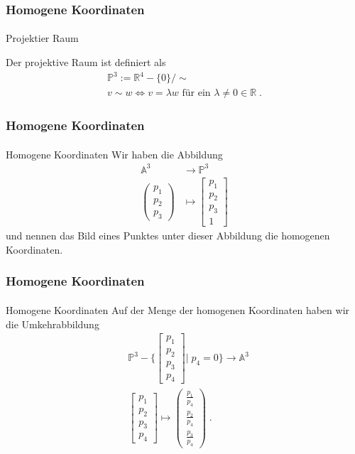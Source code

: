 \documentclass{beamer}
\begin{document}
\begin{frame}
    \frametitle{Homogene Koordinaten}
\framesubtitle{}
\begin{block}{Projektier Raum}

Der projektive  Raum ist definiert als
\begin{align*}
\mathbb{P}^3 := \mathbb{R}^{4} - \{ 0\} / \sim \\
v \sim w \Leftrightarrow v = \lambda w \text{ für ein } \lambda \neq 0 \in \mathbb{R} \; . 
\end{align*}
\end{block}
\end{frame}

\begin{frame}
    \frametitle{Homogene Koordinaten}
\framesubtitle{}
\begin{block}{Homogene Koordinaten}
Wir haben die Abbildung
\begin{align*}
\mathbb{A}^3 & \to \mathbb{P}^3 \\
\begin{pmatrix} p_1 \\ p_2 \\ p_3 \end{pmatrix} & \mapsto \begin{bmatrix} p_1 \\ p_2 \\ p_3  \\  1\end{bmatrix} 
\end{align*}
und nennen das Bild eines Punktes unter dieser Abbildung die homogenen Koordinaten.
\end{block}
\end{frame}

\begin{frame}
    \frametitle{Homogene Koordinaten}
\framesubtitle{}
\begin{block}{Homogene Koordinaten}
Auf der Menge der homogenen Koordinaten haben wir die Umkehrabbildung
\begin{align*}
& \mathbb{P}^3 - \Biggl \{\begin{bmatrix} p_1 \\ p_2 \\ p_3  \\ p_4 \end{bmatrix}\Bigg | \; p_{4} = 0 \Biggr \}   \to \mathbb{A}^3 \\
& \begin{bmatrix} p_1 \\ p_2 \\ p_3  \\  p_{4} \end{bmatrix}   \mapsto \begin{pmatrix}  \frac{p_1}{ p_{4}} \\ \frac{p_2}{ p_{4}}  \\ \frac{p_3}{ p_{4}}  \end{pmatrix}  \; .
\end{align*}
\end{block}
\end{frame}
\end{document}
